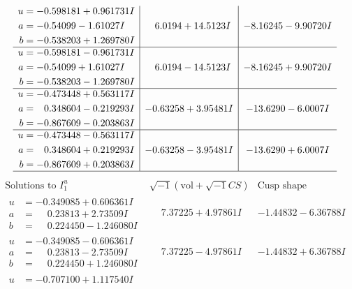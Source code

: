 \documentclass[1p]{elsarticle_modified}
\theoremstyle{definition}
\newcommand{\I}{\sqrt{-1}}
\begin{document}
$$\begin{array}{c|c|c}
\begin{aligned}
u &= -0.598181 + 0.961731 I \\
a &= -0.54099 - 1.61027 I \\
b &= -0.538203 + 1.269780 I\end{aligned}
 & \phantom{-}6.0194 + 14.5123 I & -8.16245 - 9.90720 I \\ \hline\begin{aligned}
u &= -0.598181 - 0.961731 I \\
a &= -0.54099 + 1.61027 I \\
b &= -0.538203 - 1.269780 I\end{aligned}
 & \phantom{-}6.0194 - 14.5123 I & -8.16245 + 9.90720 I \\ \hline\begin{aligned}
u &= -0.473448 + 0.563117 I \\
a &= \phantom{-}0.348604 - 0.219293 I \\
b &= -0.867609 - 0.203863 I\end{aligned}
 & -0.63258 + 3.95481 I & -13.6290 - 6.0007 I \\ \hline\begin{aligned}
u &= -0.473448 - 0.563117 I \\
a &= \phantom{-}0.348604 + 0.219293 I \\
b &= -0.867609 + 0.203863 I\end{aligned}
 & -0.63258 - 3.95481 I & -13.6290 + 6.0007 I\\
 \hline 
 \end{array}$$\newpage$$\begin{array}{c|c|c}  
\text{Solutions to }I^u_{1}& \I (\text{vol} + \sqrt{-1}CS) & \text{Cusp shape}\\
 \hline 
\begin{aligned}
u &= -0.349085 + 0.606361 I \\
a &= \phantom{-}0.23813 + 2.73509 I \\
b &= \phantom{-}0.224450 - 1.246080 I\end{aligned}
 & \phantom{-}7.37225 + 4.97861 I & -1.44832 - 6.36788 I \\ \hline\begin{aligned}
u &= -0.349085 - 0.606361 I \\
a &= \phantom{-}0.23813 - 2.73509 I \\
b &= \phantom{-}0.224450 + 1.246080 I\end{aligned}
 & \phantom{-}7.37225 - 4.97861 I & -1.44832 + 6.36788 I \\ \hline\begin{aligned}
u &= -0.707100 + 1.117540 I \\

\end{aligned}
\end{array}$$
\end{document}
